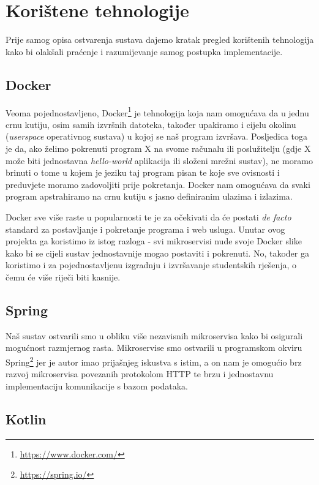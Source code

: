 \documentclass[times, utf8, zavrsni]{fer}
\begin{document}
\section{Korištene tehnologije}

Prije samog opisa ostvarenja sustava dajemo kratak pregled korištenih tehnologija kako bi olakšali praćenje i razumijevanje samog postupka implementacije.

\subsection{Docker}

Veoma pojednostavljeno, Docker{\footnote{\url{https://www.docker.com/}}} je tehnologija koja nam omogućava da u jednu crnu kutiju, osim samih izvršnih datoteka, također upakiramo i cijelu okolinu (\textit{userspace} operativnog sustava) u kojoj se naš program izvršava. Posljedica toga je da, ako želimo pokrenuti program X na svome računalu ili poslužitelju (gdje X može biti jednostavna \textit{hello-world} aplikacija ili složeni mrežni sustav), ne moramo brinuti o tome u kojem je jeziku taj program pisan te koje sve ovisnosti i preduvjete moramo zadovoljiti prije pokretanja. Docker nam omogućava da svaki program apstrahiramo na crnu kutiju s jasno definiranim ulazima i izlazima.

Docker sve više raste u popularnosti te je za očekivati da će postati \textit{de facto} standard za postavljanje i pokretanje programa i web usluga. Unutar ovog projekta ga koristimo iz istog razloga - svi mikroservisi nude svoje Docker slike kako bi se cijeli sustav jednostavnije mogao postaviti i pokrenuti. No, također ga koristimo i za pojednostavljenu izgradnju i izvršavanje studentskih rješenja, o čemu će više riječi biti kasnije.

\subsection{Spring}

Naš sustav ostvarili smo u obliku više nezavisnih mikroservisa kako bi osigurali mogućnost razmjernog rasta. Mikroservise smo ostvarili u programskom okviru Spring{\footnote{\url{https://spring.io/}}} jer je autor imao prijašnjeg iskustva s istim, a on nam je omogućio brz razvoj mikroservisa povezanih protokolom HTTP te brzu i jednostavnu implementaciju komunikacije s bazom podataka.

\subsection{Kotlin}
\end{document}
